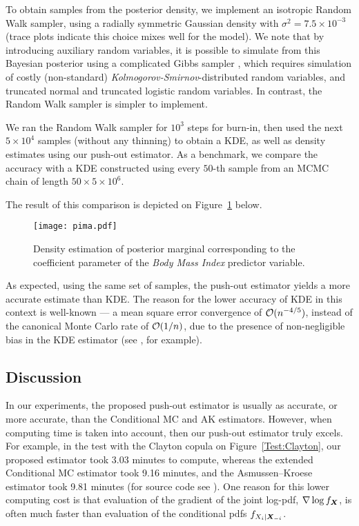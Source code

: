 To obtain samples from the posterior density, we implement an isotropic Random Walk sampler, using a radially symmetric Gaussian density with $\sigma^2 = 7.5\times 10^{-3}$ (trace plots indicate this choice mixes well for the model). We note that by introducing 
auxiliary random variables, it is possible to simulate from this Bayesian posterior  using a complicated Gibbs sampler  \cite[Equation 8]{holmes2006bayesian}, which requires simulation of costly (non-standard) \emph{Kolmogorov-Smirnov}-distributed random variables, and truncated normal and truncated logistic random variables.  In contrast, the Random Walk sampler is simpler to implement. 



We ran the Random Walk sampler for $10^3$ steps for burn-in, then used the next $5 \times 10^4$ samples (without any thinning) to obtain a KDE, as well as density estimates using our push-out estimator.  As a benchmark, we  compare the accuracy with a KDE constructed using every $50$-th  sample from an MCMC chain of length $50\times 5 \times 10^6$. 




The result of this comparison is depicted on Figure~\ref{fig:marginal} below.
\begin{figure}[H]
    \centering 
    \texttt{[image: pima.pdf]}
    \caption{Density estimation of posterior marginal corresponding to the coefficient parameter of the {\em Body Mass Index} predictor variable.}
    \label{fig:marginal}
\end{figure}



As expected, using the same set of samples, the push-out estimator yields a  more accurate estimate than KDE. The reason for the lower accuracy of KDE  in this context is well-known --- a mean square error convergence of
$\mathcal{O}(n^{-4/5})$, instead of the canonical Monte Carlo rate of $\mathcal{O}(1/n)$,
due to the presence of non-negligible bias in the KDE estimator (see \cite{botev2010kernel}, for example).



\subsection{Discussion} \label{sec:Discussion}
In our experiments, the proposed push-out estimator is usually as accurate, or more accurate, than the Conditional MC and AK estimators. However, when computing time is taken into account, then our push-out estimator truly excels.  For example, in the test with the Clayton copula on Figure~\ref{Test:Clayton}, our proposed estimator took 3.03 minutes to compute, whereas the extended Conditional MC estimator took 9.16 minutes, and the Asmussen--Kroese estimator took 9.81 minutes
(for source code see \cite{Code}). One reason for this lower computing cost is that evaluation of the gradient of the joint log-pdf, $\nabla \log f_{\boldsymbol{X}}$, is often much faster than evaluation of the conditional pdfs $f_{X_i | \boldsymbol{X}_{-i}}$.  

